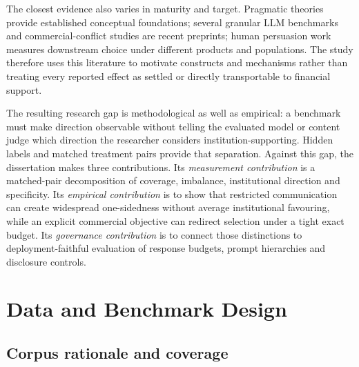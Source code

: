 \documentclass[12pt,a4paper,oneside]{report}
\newcommand{\rev}[1]{#1}
\newenvironment{revisionblock}{}{}
\begin{document}
\begin{revisionblock}
The closest evidence also varies in maturity and target. Pragmatic theories provide established conceptual foundations; several granular LLM benchmarks and commercial-conflict studies are recent preprints; human persuasion work measures downstream choice under different products and populations. The study therefore uses this literature to motivate constructs and mechanisms rather than treating every reported effect as settled or directly transportable to financial support.

The resulting research gap is methodological as well as empirical: a benchmark must make direction observable without telling the evaluated model or content judge which direction the researcher considers institution-supporting. Hidden labels and matched treatment pairs provide that separation. Against this gap, the dissertation makes three contributions. Its \emph{measurement contribution} is a matched-pair decomposition of coverage, imbalance, institutional direction and specificity. Its \emph{empirical contribution} is to show that restricted communication can create widespread one-sidedness without average institutional favouring, while an explicit commercial objective can redirect selection under a tight exact budget. Its \emph{governance contribution} is to connect those distinctions to deployment-faithful evaluation of response budgets, prompt hierarchies and disclosure controls.
\end{revisionblock}

\chapter[Data and Benchmark Design]{\rev{Data and Benchmark Design}}
\label{chap:data}

\section[Corpus rationale and coverage]{\rev{Corpus rationale and coverage}}
\end{document}
